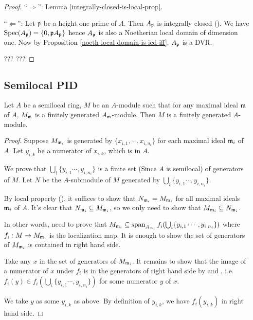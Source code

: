 \begin{proof}
``$\Rightarrow$'': Lemma \ref{integrally-closed-is-local-prop}.

``$\Leftarrow$'': Let ${\mathfrak{p}}$ be a height one prime of $A$.
Then $A_{\mathfrak{p}}$ is integrally closed ().
We have ${\mathrm{Spec}}(A_{\mathfrak{p}})=\{0,{\mathfrak{p}} A_{\mathfrak{p}}\}$ hence
$A_{\mathfrak{p}}$ is also a Noetherian local domain of dimension one.
Now by Proposition \ref{noeth-local-domain-is-icd-iff}, $A_{\mathfrak{p}}$ is a DVR.

??? ???
\end{proof}

\subsection{Semilocal PID}

\begin{lem}
\label{semilocal-fg-mod}
\leanok
Let $A$ be a semilocal ring, $M$ be an $A$-module such that
for any maximal ideal ${\mathfrak{m}}$ of $A$, $M_{\mathfrak{m}}$ is a finitely generated $A_{\mathfrak{m}}$-module.
Then $M$ is a finitely generated $A$-module.
\end{lem}

\begin{proof}
\leanok
Suppose $M_{{\mathfrak{m}}_i}$ is generated by $\{x_{i,1},\cdots, x_{i,n_i}\}$ for each maximal ideal ${\mathfrak{m}}_i$ of $A$.
Let $y_{i,k}$ be a numerator of $x_{i,k}$, which is in $A$.

We prove that $\bigcup_{i}\{y_{i,1} \cdots, y_{i,n_i}\}$
is a finite set (Since $A$ is semilocal) of generators of $M$.
Let $N$ be the $A$-submodule of $M$ generated by $\bigcup_{i}\{y_{i,1} \cdots, y_{i,n_i}\}$.

By local property (), it suffices to show that
$N_{{\mathfrak{m}}_{i}} = M_{{\mathfrak{m}}_{i}}$ for all maximal ideals ${\mathfrak{m}}_i$ of $A$.
It's clear that $N_{{\mathfrak{m}}_{i}} \subseteq  M_{{\mathfrak{m}}_{i}}$, so we only need to show that $M_{{\mathfrak{m}}_{i}} \subseteq  N_{{\mathfrak{m}}_{i}}$.

In other words, need to prove that $M_{{\mathfrak{m}}_{i}} \subseteq
\operatorname{span}_{A_{{\mathfrak{m}}_i}} f_i (\bigcup_{i}\{y_{i,1} \cdots, y_{i,n_i}\})$
where $f_i : M \to M_{{\mathfrak{m}}_i}$ is the localization map.
It is enough to show the set of generators of $M_{{\mathfrak{m}}_{i}}$ is contained in right hand side.

Take any $x$ in the set of generators of $M_{{\mathfrak{m}}_{i}}$.
It remains to show that the image of a numerator of $x$ under $f_i$
is in the generators of right hand side by
 and .
i.e. $f_i(y) \in f_i (\bigcup_{i}\{y_{i,1} \cdots, y_{i,n_i}\})$
for some numerator $y$ of $x$.

We take $y$ as some $y_{i,k}$ as above.
By definition of $y_{i,k}$, we have $f_i(y_{i,k})$ in right hand side.
\end{proof}

